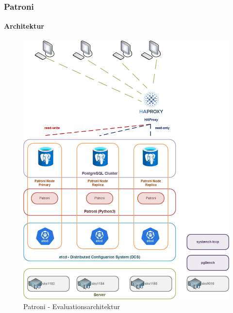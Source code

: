 
\begin{flushleft}
    \subsubsection{Patroni}
    \paragraph{Architektur}
        \begin{figure}[H]
            \centering
            \includegraphics[width=0.8\linewidth]{source/implementation/evaluation/postgresql_ha_solutions/patroni/patroni-evaluation-architecture.png}
            \caption{Patroni - Evaluationsarchitektur}
            \label{fig:patroni-evaluation-architecture.png}
        \end{figure}
\end{flushleft}